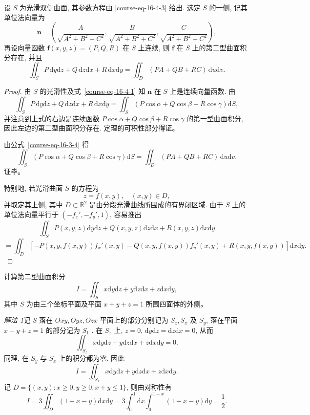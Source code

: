 \documentclass[UTF8,12pt,a4paper,fontset=fandol]{ctexart}
\begin{document}
\begin{theorem}\label{course-theorem-16-4-1}\quad 设 $S$ 为光滑双侧曲面, 其参数方程由 \eqref{course-eq-16-4-3}  给出. 选定 $S$ 的一侧, 记其单位法向量为
\[
  \boldsymbol n=\left(
    \frac{A}{\sqrt{A^2+B^2+C^2}},
    \frac{B}{\sqrt{A^2+B^2+C^2}},
    \frac{C}{\sqrt{A^2+B^2+C^2}}
  \right),
\]
再设向量函数 $\boldsymbol f(x,y,z)=(P,Q,R)$ 在 $S$ 上连续, 则 $\boldsymbol f$ 在 $S$ 上的第二型曲面积分存在, 并且
\[
  \iint_S P\,\mathrm dy\mathrm dz+Q\,\mathrm dz\mathrm dx+R\,\mathrm dx\mathrm dy
  =\iint_D(PA+QB+RC)\,\mathrm du\mathrm dv.
\]

\end{theorem}
\begin{proof}\quad 由 $S$ 的光滑性及式~\eqref{course-eq-16-4-1}  知 $\boldsymbol n$ 在 $S$ 上是连续向量函数. 由
\begin{equation}
  \iint_S P\,\mathrm dy\mathrm dz+Q\,\mathrm dz\mathrm dx+R\,\mathrm dx\mathrm dy
  =\iint_S(P\cos\alpha+Q\cos\beta+R\cos\gamma)\mathrm dS,
  \label{course-eq-16-4-4}
\end{equation}
并注意到上式的右边是连续函数 $P\cos\alpha+Q\cos\beta+R\cos\gamma$ 的第一型曲面积分, 因此左边的第二型曲面积分存在. 定理的可积性部分得证。

由公式~\eqref{course-eq-16-3-4}  得
\[
  \iint_S(P\cos\alpha+Q\cos\beta+R\cos\gamma)\mathrm dS
  =\iint_D(PA+QB+RC)\,\mathrm du\mathrm dv.
\]
证毕。

特别地, 若光滑曲面 $S$ 的方程为
\[
  z=f(x,y),\quad (x,y)\in D,
\]
并取定其上侧, 其中 $D\subset\mathbb R^2$ 是由分段光滑曲线所围成的有界闭区域. 由于 $S$ 上的单位法向量平行于 $(-f_x',-f_y',1)$, 容易推出
\[
  \iint_S P(x,y,z)\mathrm dy\mathrm dz+Q(x,y,z)\mathrm dz\mathrm dx+R(x,y,z)\mathrm dx\mathrm dy
\]
\[
  =\iint_D[-P(x,y,f(x,y))f_x'(x,y)-Q(x,y,f(x,y))f_y'(x,y)
  +R(x,y,f(x,y))]\mathrm dx\mathrm dy.
\]

\end{proof}
\begin{example}\label{course-example-16-4-2}\quad 计算第二型曲面积分
\[
  I=\iint_S x\mathrm dy\mathrm dz+y\mathrm dz\mathrm dx+z\mathrm dx\mathrm dy,
\]
其中 $S$ 为由三个坐标平面及平面 $x+y+z=1$ 所围四面体的外侧。

\end{example}
\noindent\emph{解法 1}\quad 记 $S$ 落在 $Oxy,Oyz,Ozx$ 平面上的部分分别记为 $S_z,S_x$ 及 $S_y$, 落在平面 $x+y+z=1$ 的部分记为 $S_1$ . 在 $S_z$ 上, $z=0$, $\mathrm dy\mathrm dz=\mathrm dz\mathrm dx=0$, 从而
\[
  \iint_{S_z}x\mathrm dy\mathrm dz+y\mathrm dz\mathrm dx+z\mathrm dx\mathrm dy=0.
\]
同理, 在 $S_y$ 与 $S_x$ 上的积分都为零. 因此
\[
  I=\iint_{S_1}x\mathrm dy\mathrm dz+y\mathrm dz\mathrm dx+z\mathrm dx\mathrm dy.
\]
记 $D=\{(x,y):x\geqslant0,y\geqslant0,x+y\leqslant1\}$, 则由对称性有
\[
  I=3\iint_D(1-x-y)\mathrm dx\mathrm dy
  =3\int_0^1\mathrm dx\int_0^{1-x}(1-x-y)\mathrm dy=\frac12.
\]
\end{document}
